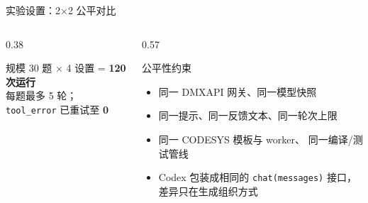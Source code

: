 \documentclass[10pt,aspectratio=169]{beamer}
\begin{document}
\begin{frame}{实验设置：2×2 公平对比}
	\begin{columns}[T]
		\begin{column}{0.38\textwidth}
			\centering
			\renewcommand{\arraystretch}{1.3}
			\vspace{0.8em}
			\begin{block}{规模}
				30 题 × 4 设置 = \textbf{120 次运行} \\
				每题最多 5 轮；\texttt{tool\_error}
				已重试至 \textbf{0}
			\end{block}
		\end{column}
		\begin{column}{0.57\textwidth}
			\begin{block}{公平性约束}
				\begin{itemize}
					\item 同一 DMXAPI 网关、同一模型快照
					\item 同一提示、同一反馈文本、同一轮次上限
					\item 同一 CODESYS 模板与 worker、
					      同一编译/测试管线
					\item Codex 包装成相同的
					      \texttt{chat(messages)} 接口，
					      差异只在生成组织方式
				\end{itemize}
			\end{block}
		\end{column}
	\end{columns}
\end{frame}
\end{document}
